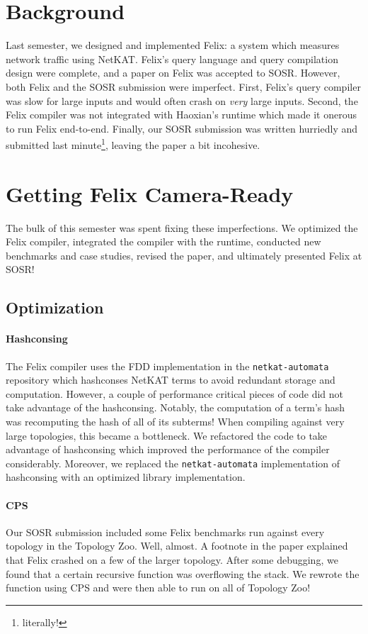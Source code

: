 \section{Background}
Last semester, we designed and implemented Felix: a system which measures
network traffic using NetKAT. Felix's query language and query compilation
design were complete, and a paper on Felix was accepted to SOSR. However,
both Felix and the SOSR submission were imperfect. First, Felix's query
compiler was slow for large inputs and would often crash on \emph{very} large
inputs. Second, the Felix compiler was not integrated with Haoxian's runtime
which made it onerous to run Felix end-to-end. Finally, our SOSR submission was
written hurriedly and submitted last minute\footnote{literally!}, leaving the
paper a bit incohesive.

\section{Getting Felix Camera-Ready}
The bulk of this semester was spent fixing these imperfections. We optimized
the Felix compiler, integrated the compiler with the runtime, conducted new
benchmarks and case studies, revised the paper, and ultimately presented Felix
at SOSR!

\subsection{Optimization}
\newcommand{\netauto}{\texttt{netkat-automata}}
\paragraph{Hashconsing}
The Felix compiler uses the FDD implementation in the \netauto{} repository
which hashconses NetKAT terms to avoid redundant storage and computation.
However, a couple of performance critical pieces of code did not take advantage
of the hashconsing. Notably, the computation of a term's hash was recomputing
the hash of all of its subterms! When compiling against very large topologies,
this became a bottleneck. We refactored the code to take advantage of
hashconsing which improved the performance of the compiler considerably.
Moreover, we replaced the \netauto{} implementation of hashconsing with an
optimized library implementation.

\paragraph{CPS}
Our SOSR submission included some Felix benchmarks run against every topology
in the Topology Zoo. Well, almost. A footnote in the paper explained that Felix
crashed on a few of the larger topology. After some debugging, we found that a
certain recursive function was overflowing the stack. We rewrote the function
using CPS and were then able to run on all of Topology Zoo!

